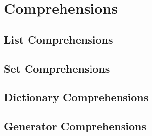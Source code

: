 \section{Comprehensions}

  \subsection{List Comprehensions}
  
  \subsection{Set Comprehensions}

  \subsection{Dictionary Comprehensions}

  \subsection{Generator Comprehensions}

